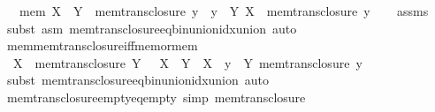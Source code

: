 \begin{isabellebody}
\ \ \ {\isacharparenleft}{\kern0pt}mem{\isacharparenright}{\kern0pt}\ {\isachardoublequoteopen}X\ {\isasymin}\ Y{\isachardoublequoteclose}\ {\isacharbar}{\kern0pt}\ {\isacharparenleft}{\kern0pt}mem{\isacharunderscore}{\kern0pt}trans{\isacharunderscore}{\kern0pt}closure{\isacharparenright}{\kern0pt}\ y\ \ {\isachardoublequoteopen}y\ {\isasymin}\ Y{\isachardoublequoteclose}\ {\isachardoublequoteopen}X\ {\isasymin}\ mem{\isacharunderscore}{\kern0pt}trans{\isacharunderscore}{\kern0pt}closure\ y{\isachardoublequoteclose}\isanewline
%
\isadelimproof
\ \ %
\endisadelimproof
%
\isatagproof
{}\isamarkupfalse%
\ assms\ \isamarkupfalse%
\ {\isacharparenleft}{\kern0pt}subst\ {\isacharparenleft}{\kern0pt}asm{\isacharparenright}{\kern0pt}\ mem{\isacharunderscore}{\kern0pt}trans{\isacharunderscore}{\kern0pt}closure{\isacharunderscore}{\kern0pt}eq{\isacharunderscore}{\kern0pt}bin{\isacharunderscore}{\kern0pt}union{\isacharunderscore}{\kern0pt}idx{\isacharunderscore}{\kern0pt}union{\isacharparenright}{\kern0pt}\ auto%
\endisatagproof
{\isafoldproof}%
%
\isadelimproof
\isanewline
%
\endisadelimproof
\isanewline
{}\isamarkupfalse%
\ mem{\isacharunderscore}{\kern0pt}mem{\isacharunderscore}{\kern0pt}trans{\isacharunderscore}{\kern0pt}closure{\isacharunderscore}{\kern0pt}iff{\isacharunderscore}{\kern0pt}mem{\isacharunderscore}{\kern0pt}or{\isacharunderscore}{\kern0pt}mem{\isacharcolon}{\kern0pt}\isanewline
\ \ {\isachardoublequoteopen}X\ {\isasymin}\ mem{\isacharunderscore}{\kern0pt}trans{\isacharunderscore}{\kern0pt}closure\ Y\ {\isasymlongleftrightarrow}\ \ X\ {\isasymin}\ Y\ {\isasymor}\ {\isacharparenleft}{\kern0pt}X\ {\isasymin}\ {\isacharparenleft}{\kern0pt}{\isasymUnion}y\ {\isasymin}\ Y{\isachardot}{\kern0pt}\ mem{\isacharunderscore}{\kern0pt}trans{\isacharunderscore}{\kern0pt}closure\ y{\isacharparenright}{\kern0pt}{\isacharparenright}{\kern0pt}{\isachardoublequoteclose}\isanewline
%
\isadelimproof
\ \ %
\endisadelimproof
%
\isatagproof
{}\isamarkupfalse%
\ {\isacharparenleft}{\kern0pt}subst\ mem{\isacharunderscore}{\kern0pt}trans{\isacharunderscore}{\kern0pt}closure{\isacharunderscore}{\kern0pt}eq{\isacharunderscore}{\kern0pt}bin{\isacharunderscore}{\kern0pt}union{\isacharunderscore}{\kern0pt}idx{\isacharunderscore}{\kern0pt}union{\isacharparenright}{\kern0pt}\ auto%
\endisatagproof
{\isafoldproof}%
%
\isadelimproof
\isanewline
%
\endisadelimproof
\isanewline
{}\isamarkupfalse%
\ mem{\isacharunderscore}{\kern0pt}trans{\isacharunderscore}{\kern0pt}closure{\isacharunderscore}{\kern0pt}empty{\isacharunderscore}{\kern0pt}eq{\isacharunderscore}{\kern0pt}empty\ {\isacharbrackleft}{\kern0pt}simp{\isacharbrackright}{\kern0pt}{\isacharcolon}{\kern0pt}\ {\isachardoublequoteopen}mem{\isacharunderscore}{\kern0pt}trans{\isacharunderscore}{\kern0pt}closure\ {\isacharbraceleft}{\kern0pt}{\isacharbraceright}{\kern0pt}\ {\isacharequal}{\kern0pt}\ {\isacharbraceleft}{\kern0pt}{\isacharbraceright}{\kern0pt}{\isachardoublequoteclose}\isanewline

\end{isabellebody}
